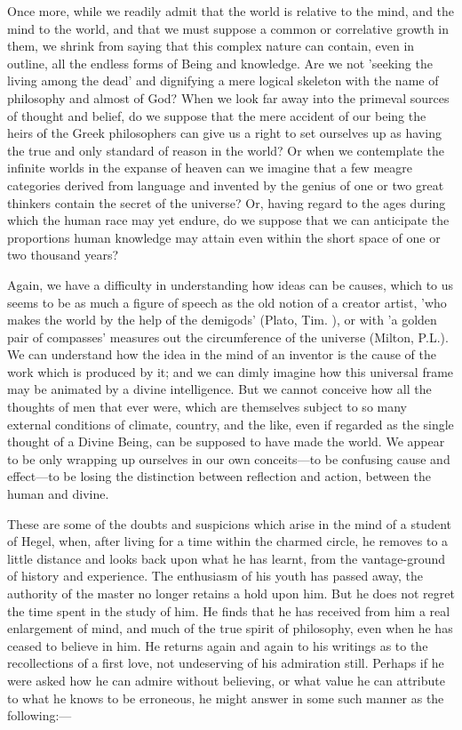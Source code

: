 \documentclass[11pt,letter]{article}
\begin{document}
\par  Once more, while we readily admit that the world is relative to the mind, and the mind to the world, and that we must suppose a common or correlative growth in them, we shrink from saying that this complex nature can contain, even in outline, all the endless forms of Being and knowledge. Are we not 'seeking the living among the dead' and dignifying a mere logical skeleton with the name of philosophy and almost of God? When we look far away into the primeval sources of thought and belief, do we suppose that the mere accident of our being the heirs of the Greek philosophers can give us a right to set ourselves up as having the true and only standard of reason in the world? Or when we contemplate the infinite worlds in the expanse of heaven can we imagine that a few meagre categories derived from language and invented by the genius of one or two great thinkers contain the secret of the universe? Or, having regard to the ages during which the human race may yet endure, do we suppose that we can anticipate the proportions human knowledge may attain even within the short space of one or two thousand years?

\par  Again, we have a difficulty in understanding how ideas can be causes, which to us seems to be as much a figure of speech as the old notion of a creator artist, 'who makes the world by the help of the demigods' (Plato, Tim. ), or with 'a golden pair of compasses' measures out the circumference of the universe (Milton, P.L.). We can understand how the idea in the mind of an inventor is the cause of the work which is produced by it; and we can dimly imagine how this universal frame may be animated by a divine intelligence. But we cannot conceive how all the thoughts of men that ever were, which are themselves subject to so many external conditions of climate, country, and the like, even if regarded as the single thought of a Divine Being, can be supposed to have made the world. We appear to be only wrapping up ourselves in our own conceits—to be confusing cause and effect—to be losing the distinction between reflection and action, between the human and divine.

\par  These are some of the doubts and suspicions which arise in the mind of a student of Hegel, when, after living for a time within the charmed circle, he removes to a little distance and looks back upon what he has learnt, from the vantage-ground of history and experience. The enthusiasm of his youth has passed away, the authority of the master no longer retains a hold upon him. But he does not regret the time spent in the study of him. He finds that he has received from him a real enlargement of mind, and much of the true spirit of philosophy, even when he has ceased to believe in him. He returns again and again to his writings as to the recollections of a first love, not undeserving of his admiration still. Perhaps if he were asked how he can admire without believing, or what value he can attribute to what he knows to be erroneous, he might answer in some such manner as the following:—
\end{document}
